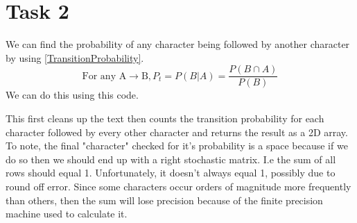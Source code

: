 \documentclass[11pt,a4paper]{CLabBookTemplate} %
\begin{document}
\section{Task 2}
We can find the probability of any character being followed by another character by using \eqref{TransitionProbability}.
\begin{equation}
	\label{TransitionProbability}
	\textrm{For any A} \rightarrow \textrm{B}, P_{t} = P(B|A) = \frac{P(B \cap A)}{P(B)} 
\end{equation}
We can do this using this code. 

This first cleans up the text then counts the transition probability for each character followed by every other character and returns the result as a 2D array. To note, the final "character" checked for it's probability is a space because if we do so then we should end up with a right stochastic matrix. I.e the sum of all rows should equal 1. Unfortunately, it doesn't always equal 1, possibly due to round off error. Since some characters occur orders of magnitude more frequently than others, then the sum will lose precision because of the finite precision machine used to calculate it. \\
\end{document}
